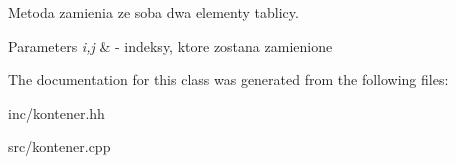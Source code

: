 Metoda zamienia ze soba dwa elementy tablicy. 


\begin{DoxyParams}{Parameters}
{\em i,j} & -\/ indeksy, ktore zostana zamienione \\
\hline
\end{DoxyParams}


The documentation for this class was generated from the following files\-:\begin{DoxyCompactItemize}
\item 
inc/kontener.\-hh\item 
src/kontener.\-cpp\end{DoxyCompactItemize}
